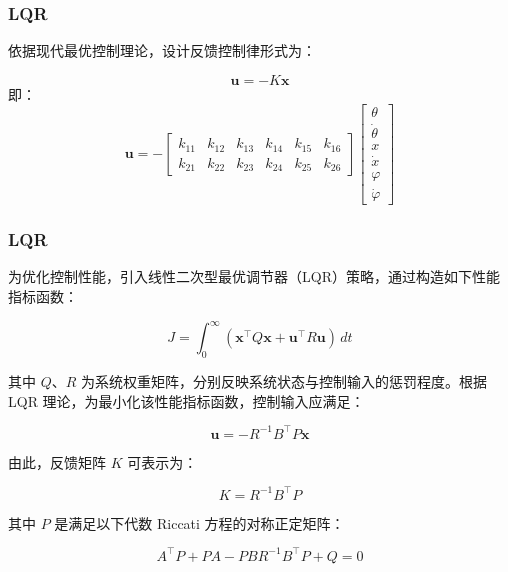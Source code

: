 \documentclass{beamer}
\begin{document}
		\begin{frame}
		\frametitle{LQR}
		依据现代最优控制理论，设计反馈控制律形式为：
		
		\[
		\mathbf{u} = -K \mathbf{x} \tag{3-7}
		\]
		即：
		\[
		\mathbf{u} = -
		\begin{bmatrix}
			k_{11} & k_{12} & k_{13} & k_{14} & k_{15} & k_{16} \\
			k_{21} & k_{22} & k_{23} & k_{24} & k_{25} & k_{26}
		\end{bmatrix}
		\begin{bmatrix}
			\theta \\
			\dot{\theta} \\
			x \\
			\dot{x} \\
			\varphi \\
			\dot{\varphi}
		\end{bmatrix}
		\tag{3-8}
		\]


		
	\end{frame}
	
	
	\begin{frame}
	\frametitle{LQR}
	为优化控制性能，引入线性二次型最优调节器（LQR）策略，通过构造如下性能指标函数：
	
	\[
	J = \int_{0}^{\infty} \left( \mathbf{x}^\top Q \mathbf{x} + \mathbf{u}^\top R \mathbf{u} \right) \, dt
	\tag{3-9}
	\]
	
	其中 $Q$、$R$ 为系统权重矩阵，分别反映系统状态与控制输入的惩罚程度。根据 LQR 理论，为最小化该性能指标函数，控制输入应满足：
	
	\[
	\mathbf{u} = -R^{-1} B^\top P \mathbf{x}
	\tag{3-10}
	\]
	
	由此，反馈矩阵 $K$ 可表示为：
	
	\[
	K = R^{-1} B^\top P
	\tag{3-11}
	\]
	
	其中 $P$ 是满足以下代数 Riccati 方程的对称正定矩阵：
	
	\[
	A^\top P + P A - P B R^{-1} B^\top P + Q = 0
	\tag{3-12}
	\]
			
	\end{frame}
\end{document}
